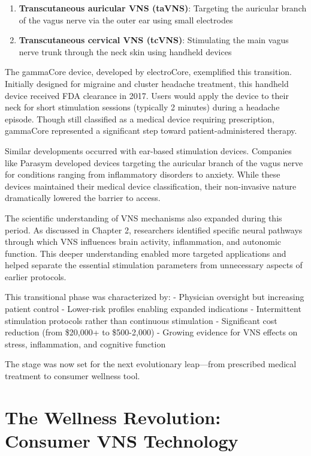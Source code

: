 \documentclass[
  Letterpaper,
]{scrbook}
\providecommand{\tightlist}{%
  \setlength{\itemsep}{0pt}\setlength{\parskip}{0pt}}\usepackage{longtable,booktabs,array}
\begin{document}
\begin{enumerate}
\def\labelenumi{\arabic{enumi}.}
\tightlist
\item
  \textbf{Transcutaneous auricular VNS (taVNS)}: Targeting the auricular
  branch of the vagus nerve via the outer ear using small electrodes
\item
  \textbf{Transcutaneous cervical VNS (tcVNS)}: Stimulating the main
  vagus nerve trunk through the neck skin using handheld devices
\end{enumerate}

The gammaCore device, developed by electroCore, exemplified this
transition. Initially designed for migraine and cluster headache
treatment, this handheld device received FDA clearance in 2017. Users
would apply the device to their neck for short stimulation sessions
(typically 2 minutes) during a headache episode. Though still classified
as a medical device requiring prescription, gammaCore represented a
significant step toward patient-administered therapy.

Similar developments occurred with ear-based stimulation devices.
Companies like Parasym developed devices targeting the auricular branch
of the vagus nerve for conditions ranging from inflammatory disorders to
anxiety. While these devices maintained their medical device
classification, their non-invasive nature dramatically lowered the
barrier to access.

The scientific understanding of VNS mechanisms also expanded during this
period. As discussed in Chapter 2, researchers identified specific
neural pathways through which VNS influences brain activity,
inflammation, and autonomic function. This deeper understanding enabled
more targeted applications and helped separate the essential stimulation
parameters from unnecessary aspects of earlier protocols.

This transitional phase was characterized by: - Physician oversight but
increasing patient control - Lower-risk profiles enabling expanded
indications - Intermittent stimulation protocols rather than continuous
stimulation - Significant cost reduction (from \$20,000+ to \$500-2,000)
- Growing evidence for VNS effects on stress, inflammation, and
cognitive function

The stage was now set for the next evolutionary leap---from prescribed
medical treatment to consumer wellness tool.

\section{The Wellness Revolution: Consumer VNS
Technology}\label{the-wellness-revolution-consumer-vns-technology}
\end{document}
